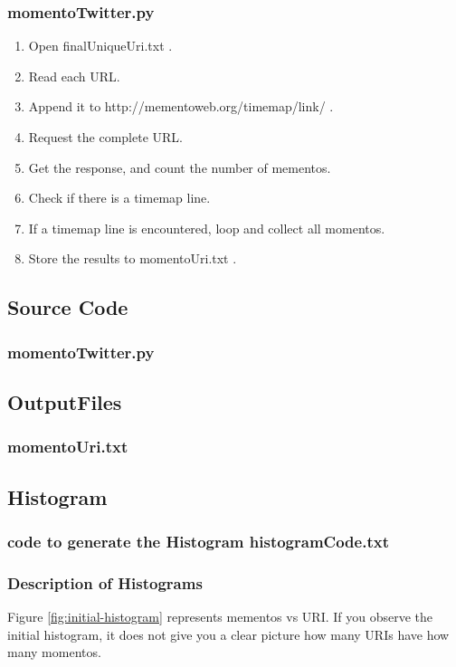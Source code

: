 \documentclass[12pt]{article}
\begin{document}
\subsubsection{momentoTwitter.py}
\begin{enumerate}
	\item Open finalUniqueUri.txt .
	\item Read each URL.
	\item Append it to http://mementoweb.org/timemap/link/ .
	\item Request the complete URL.
	\item Get the response, and count the number of mementos.
	\item Check if there is a timemap line.
	\item If a timemap line is encountered, loop and collect all  momentos.
	\item Store the results to momentoUri.txt .
\end{enumerate}
\newpage
\subsection{Source Code}
\subsubsection{momentoTwitter.py}

\newpage
\subsection{OutputFiles}
\subsubsection{momentoUri.txt}

\newpage
\subsection{Histogram }
\subsubsection{code to generate the Histogram histogramCode.txt}

\subsubsection{Description of Histograms}
Figure \ref{fig:initial-histogram} represents mementos vs URI. If you observe the initial histogram, it does not give you a clear picture how many URIs have how many momentos.
\end{document}
